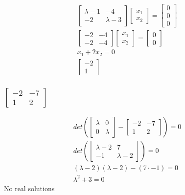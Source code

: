 \documentclass[12pt, a4paper]{article}
\begin{document}
\begin{align*}
					\begin{bmatrix}\lambda-1 & -4\\ -2 & \lambda -3\end{bmatrix}\begin{bmatrix}x_1\\x_2\end{bmatrix}=\begin{bmatrix}0\\0\\0\end{bmatrix}\\
					\begin{bmatrix}-2 & -4\\ -2 & -4 \end{bmatrix}\begin{bmatrix}x_1\\x_2\end{bmatrix}=\begin{bmatrix}0\\0\end{bmatrix}\\
					x_1+2x_2=0\\
					\begin{bmatrix}-2\\1\end{bmatrix}
				\end{align*}
			\subsubsection{$\begin{bmatrix}-2&-7\\1&2\end{bmatrix}$}
				\begin{align*}
					det(\begin{bmatrix}\lambda & 0\\0&\lambda \end{bmatrix}-\begin{bmatrix}-2&-7\\1&2\end{bmatrix})=0\\
					det(\begin{bmatrix}\lambda+2 & 7\\ -1 & \lambda -2\end{bmatrix})=0\\
					(\lambda-2)(\lambda-2)-(7\cdot -1)=0\\
					\lambda^2+3=0
				\end{align*}
				No real solutions
\end{document}
